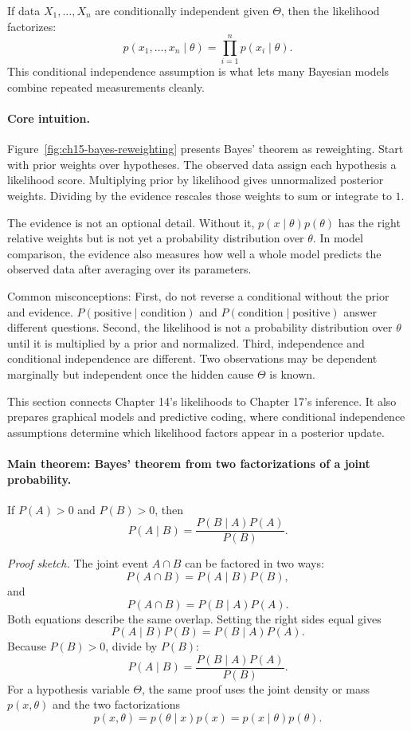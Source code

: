 If data \(X_1,\ldots,X_n\) are conditionally independent given \(\Theta\), then the likelihood factorizes:
\[
p(x_1,\ldots,x_n\mid \theta)
=\prod_{i=1}^n p(x_i\mid \theta).
\]
This conditional independence assumption is what lets many Bayesian models combine repeated measurements cleanly.

\paragraph{Core intuition.}
Figure~\ref{fig:ch15-bayes-reweighting} presents Bayes' theorem as reweighting. Start with prior weights over hypotheses. The observed data assign each hypothesis a likelihood score. Multiplying prior by likelihood gives unnormalized posterior weights. Dividing by the evidence rescales those weights to sum or integrate to \(1\).

The evidence is not an optional detail. Without it, \(p(x\mid \theta)p(\theta)\) has the right relative weights but is not yet a probability distribution over \(\theta\). In model comparison, the evidence also measures how well a whole model predicts the observed data after averaging over its parameters.

Common misconceptions: First, do not reverse a conditional without the prior and evidence. \(P(\text{positive}\mid \text{condition})\) and \(P(\text{condition}\mid \text{positive})\) answer different questions. Second, the likelihood is not a probability distribution over \(\theta\) until it is multiplied by a prior and normalized. Third, independence and conditional independence are different. Two observations may be dependent marginally but independent once the hidden cause \(\Theta\) is known.

This section connects Chapter 14's likelihoods to Chapter 17's inference. It also prepares graphical models and predictive coding, where conditional independence assumptions determine which likelihood factors appear in a posterior update.

\paragraph{Main theorem: Bayes' theorem from two factorizations of a joint probability.}
If \(P(A)>0\) and \(P(B)>0\), then
\[
P(A\mid B)=\frac{P(B\mid A)P(A)}{P(B)}.
\]

\emph{Proof sketch.}
The joint event \(A\cap B\) can be factored in two ways:
\[
P(A\cap B)=P(A\mid B)P(B),
\]
and
\[
P(A\cap B)=P(B\mid A)P(A).
\]
Both equations describe the same overlap. Setting the right sides equal gives
\[
P(A\mid B)P(B)=P(B\mid A)P(A).
\]
Because \(P(B)>0\), divide by \(P(B)\):
\[
P(A\mid B)=\frac{P(B\mid A)P(A)}{P(B)}.
\]
For a hypothesis variable \(\Theta\), the same proof uses the joint density or mass \(p(x,\theta)\) and the two factorizations
\[
p(x,\theta)=p(\theta\mid x)p(x)=p(x\mid \theta)p(\theta).
\]

